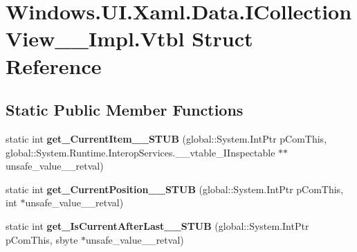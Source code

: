\hypertarget{struct_windows_1_1_u_i_1_1_xaml_1_1_data_1_1_i_collection_view_____impl_1_1_vtbl}{}\section{Windows.\+U\+I.\+Xaml.\+Data.\+I\+Collection\+View\+\_\+\+\_\+\+Impl.\+Vtbl Struct Reference}
\label{struct_windows_1_1_u_i_1_1_xaml_1_1_data_1_1_i_collection_view_____impl_1_1_vtbl}
\subsection*{Static Public Member Functions}
\begin{DoxyCompactItemize}
\item 
\mbox{\label{struct_windows_1_1_u_i_1_1_xaml_1_1_data_1_1_i_collection_view_____impl_1_1_vtbl_af4afa9645d45bff8ce19567b19f935e6}} 
static int {\bfseries get\+\_\+\+Current\+Item\+\_\+\+\_\+\+S\+T\+UB} (global\+::\+System.\+Int\+Ptr p\+Com\+This, global\+::\+System.\+Runtime.\+Interop\+Services.\+\_\+\+\_\+vtable\+\_\+\+I\+Inspectable $\ast$$\ast$unsafe\+\_\+value\+\_\+\+\_\+retval)
\item 
\mbox{\label{struct_windows_1_1_u_i_1_1_xaml_1_1_data_1_1_i_collection_view_____impl_1_1_vtbl_af335c7717f8ae12c3241c2e5417e9d37}} 
static int {\bfseries get\+\_\+\+Current\+Position\+\_\+\+\_\+\+S\+T\+UB} (global\+::\+System.\+Int\+Ptr p\+Com\+This, int $\ast$unsafe\+\_\+value\+\_\+\+\_\+retval)
\item 
\mbox{\label{struct_windows_1_1_u_i_1_1_xaml_1_1_data_1_1_i_collection_view_____impl_1_1_vtbl_a5dfdf621c1cce5486a1833879acc6785}} 
static int {\bfseries get\+\_\+\+Is\+Current\+After\+Last\+\_\+\+\_\+\+S\+T\+UB} (global\+::\+System.\+Int\+Ptr p\+Com\+This, sbyte $\ast$unsafe\+\_\+value\+\_\+\+\_\+retval)
\item 
\mbox{\label{struct_windows_1_1_u_i_1_1_xaml_1_1_data_1_1_i_collection_view_____impl_1_1_vtbl_aec02e603fdba0583cfcf5bc039d82490}} 
$$
\end{DoxyCompactItemize}
